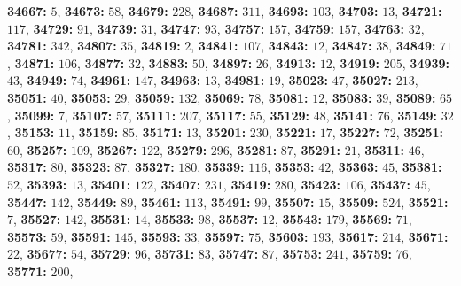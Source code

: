 \textsf{\bfseries 34667:} $5$, \textsf{\bfseries 34673:} $58$, \textsf{\bfseries 34679:} $228$, \textsf{\bfseries 34687:} $311$, \textsf{\bfseries 34693:} $103$, \textsf{\bfseries 34703:} $13$, \textsf{\bfseries 34721:} $117$, \textsf{\bfseries 34729:} $91$, \textsf{\bfseries 34739:} $31$, \textsf{\bfseries 34747:} $93$, \textsf{\bfseries 34757:} $157$, \textsf{\bfseries 34759:} $157$, \textsf{\bfseries 34763:} $32$, \textsf{\bfseries 34781:} $342$, \textsf{\bfseries 34807:} $35$, \textsf{\bfseries 34819:} $2$, \textsf{\bfseries 34841:} $107$, \textsf{\bfseries 34843:} $12$, \textsf{\bfseries 34847:} $38$, \textsf{\bfseries 34849:} $71$, \textsf{\bfseries 34871:} $106$, \textsf{\bfseries 34877:} $32$, \textsf{\bfseries 34883:} $50$, \textsf{\bfseries 34897:} $26$, \textsf{\bfseries 34913:} $12$, \textsf{\bfseries 34919:} $205$, \textsf{\bfseries 34939:} $43$, \textsf{\bfseries 34949:} $74$, \textsf{\bfseries 34961:} $147$, \textsf{\bfseries 34963:} $13$, \textsf{\bfseries 34981:} $19$, \textsf{\bfseries 35023:} $47$, \textsf{\bfseries 35027:} $213$, \textsf{\bfseries 35051:} $40$, \textsf{\bfseries 35053:} $29$, \textsf{\bfseries 35059:} $132$, \textsf{\bfseries 35069:} $78$, \textsf{\bfseries 35081:} $12$, \textsf{\bfseries 35083:} $39$, \textsf{\bfseries 35089:} $65$, \textsf{\bfseries 35099:} $7$, \textsf{\bfseries 35107:} $57$, \textsf{\bfseries 35111:} $207$, \textsf{\bfseries 35117:} $55$, \textsf{\bfseries 35129:} $48$, \textsf{\bfseries 35141:} $76$, \textsf{\bfseries 35149:} $32$, \textsf{\bfseries 35153:} $11$, \textsf{\bfseries 35159:} $85$, \textsf{\bfseries 35171:} $13$, \textsf{\bfseries 35201:} $230$, \textsf{\bfseries 35221:} $17$, \textsf{\bfseries 35227:} $72$, \textsf{\bfseries 35251:} $60$, \textsf{\bfseries 35257:} $109$, \textsf{\bfseries 35267:} $122$, \textsf{\bfseries 35279:} $296$, \textsf{\bfseries 35281:} $87$, \textsf{\bfseries 35291:} $21$, \textsf{\bfseries 35311:} $46$, \textsf{\bfseries 35317:} $80$, \textsf{\bfseries 35323:} $87$, \textsf{\bfseries 35327:} $180$, \textsf{\bfseries 35339:} $116$, \textsf{\bfseries 35353:} $42$, \textsf{\bfseries 35363:} $45$, \textsf{\bfseries 35381:} $52$, \textsf{\bfseries 35393:} $13$, \textsf{\bfseries 35401:} $122$, \textsf{\bfseries 35407:} $231$, \textsf{\bfseries 35419:} $280$, \textsf{\bfseries 35423:} $106$, \textsf{\bfseries 35437:} $45$, \textsf{\bfseries 35447:} $142$, \textsf{\bfseries 35449:} $89$, \textsf{\bfseries 35461:} $113$, \textsf{\bfseries 35491:} $99$, \textsf{\bfseries 35507:} $15$, \textsf{\bfseries 35509:} $524$, \textsf{\bfseries 35521:} $7$, \textsf{\bfseries 35527:} $142$, \textsf{\bfseries 35531:} $14$, \textsf{\bfseries 35533:} $98$, \textsf{\bfseries 35537:} $12$, \textsf{\bfseries 35543:} $179$, \textsf{\bfseries 35569:} $71$, \textsf{\bfseries 35573:} $59$, \textsf{\bfseries 35591:} $145$, \textsf{\bfseries 35593:} $33$, \textsf{\bfseries 35597:} $75$, \textsf{\bfseries 35603:} $193$, \textsf{\bfseries 35617:} $214$, \textsf{\bfseries 35671:} $22$, \textsf{\bfseries 35677:} $54$, \textsf{\bfseries 35729:} $96$, \textsf{\bfseries 35731:} $83$, \textsf{\bfseries 35747:} $87$, \textsf{\bfseries 35753:} $241$, \textsf{\bfseries 35759:} $76$, \textsf{\bfseries 35771:} $200$, 
